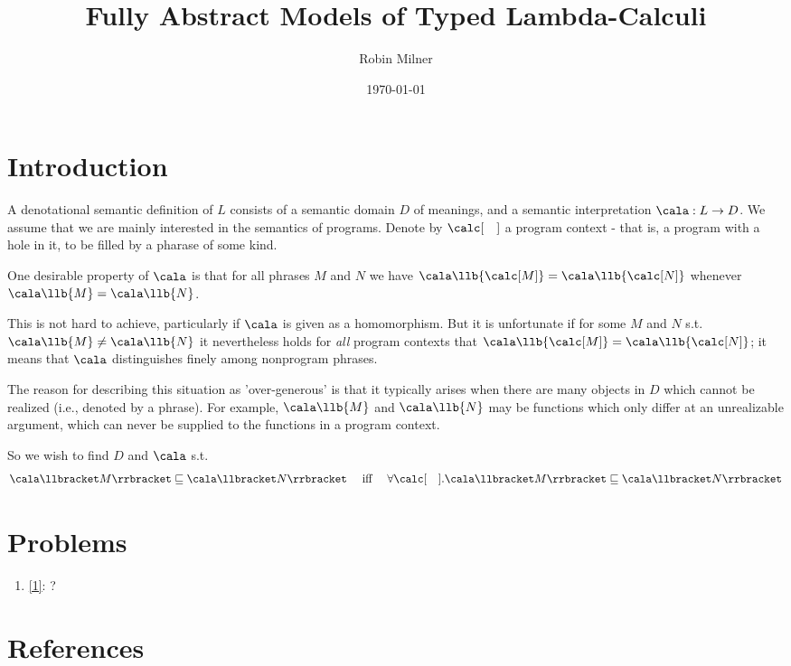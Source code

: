 \documentclass[11pt]{article}
\author{Robin Milner}
\date{\today}
\title{Fully Abstract Models of Typed Lambda-Calculi}
\newcommand{\CA}[1]{\cala\llbracket #1 \rrbracket}
\begin{document}
\maketitle
\section{Introduction}
\label{sec:org895c4ba}
A denotational semantic definition of \(L\) consists of a semantic domain \(D\) of meanings, and a
semantic interpretation \(\cala:L\to D\). We assume that we are mainly interested in the semantics of
programs. Denote by \(\calc[\quad]\) a program context - that is, a program with a hole in it, to be
filled by a pharase of some kind.

One desirable property of \(\cala\) is that for all phrases \(M\) and \(N\) we have
\(\cala\llb{\calc[M]}=\cala\llb{\calc[N]}\) whenever \(\cala\llb{M}=\cala\llb{N}\).

This is not hard to achieve, particularly if \(\cala\) is given as a homomorphism. But it is
unfortunate if for some \(M\) and \(N\) s.t. \(\cala\llb{M}\neq\cala\llb{N}\) it nevertheless holds
for \emph{all} program contexts that \(\cala\llb{\calc[M]}=\cala\llb{\calc[N]}\); it means that \(\cala\)
distinguishes finely among nonprogram phrases.

The reason for describing this situation as 'over-generous' is that it typically arises when there are
many objects in \(D\) which cannot be realized (i.e., denoted by a phrase). For example,
\(\cala\llb{M}\) and \(\cala\llb{N}\) may be functions which only differ at an unrealizable argument,
which can never be supplied to the functions in a program context.
\label{1}

So we wish to find \(D\) and \(\cala\) s.t.
\begin{equation*}
\CA{M}\sqsubseteq\CA{N}\quad\text{ iff }\quad\forall\calc[\quad].\CA{M}\sqsubseteq\CA{N}
\end{equation*}
\section{Problems}
\label{sec:org6c5aff6}
\begin{enumerate}
\item \ref{1}: ?
\end{enumerate}
\section{References}
\label{sec:orgb02b019}
\label{bibliographystyle link}



\end{document}
